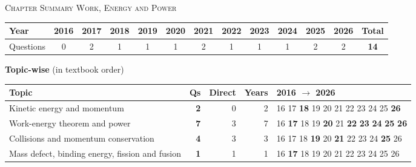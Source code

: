 \par{}\vspace{14pt}
\begin{center}{}\par
{\large\color{navy}\scshape Chapter Summary \textperiodcentered{} Work, Energy and Power}\end{center}
{\small\setlength{\tabcolsep}{3.5pt}
\begin{tabular*}{\linewidth}{@{\extracolsep{\fill}}l*{11}{c}c@{}}\toprule
Year & 2016 & 2017 & 2018 & 2019 & 2020 & 2021 & 2022 & 2023 & 2024 & 2025 & 2026 & Total\\\midrule
Questions & 0 & 2 & 1 & 1 & 1 & 2 & 1 & 1 & 1 & 2 & 2 & \textbf{14}\\\bottomrule\end{tabular*}}\par\medskip
{\small\textbf{\color{crimson}Topic-wise} (in textbook order)\par\smallskip
\begin{tabularx}{\linewidth}{@{}>{\raggedright\arraybackslash}Xrrrl@{}}\toprule
Topic & Qs & Direct & Years & 2016 $\rightarrow$ 2026\\\midrule
Kinetic energy and momentum & \textbf{2} & 0 & 2 & {\scriptsize {\color{gray!45}16} {\color{gray!45}17} \textbf{18} {\color{gray!45}19} {\color{gray!45}20} {\color{gray!45}21} {\color{gray!45}22} {\color{gray!45}23} {\color{gray!45}24} {\color{gray!45}25} \textbf{26}}\\
Work-energy theorem and power & \textbf{7} & 3 & 7 & {\scriptsize {\color{gray!45}16} \textbf{17} {\color{gray!45}18} {\color{gray!45}19} \textbf{20} {\color{gray!45}21} \textbf{22} \textbf{23} \textbf{24} \textbf{25} \textbf{26}}\\
Collisions and momentum conservation & \textbf{4} & 3 & 3 & {\scriptsize {\color{gray!45}16} {\color{gray!45}17} {\color{gray!45}18} \textbf{19} {\color{gray!45}20} \textbf{21} {\color{gray!45}22} {\color{gray!45}23} {\color{gray!45}24} \textbf{25} {\color{gray!45}26}}\\
Mass defect, binding energy, fission and fusion & \textbf{1} & 1 & 1 & {\scriptsize {\color{gray!45}16} \textbf{17} {\color{gray!45}18} {\color{gray!45}19} {\color{gray!45}20} {\color{gray!45}21} {\color{gray!45}22} {\color{gray!45}23} {\color{gray!45}24} {\color{gray!45}25} {\color{gray!45}26}}\\
\bottomrule\end{tabularx}}\par\medskip
